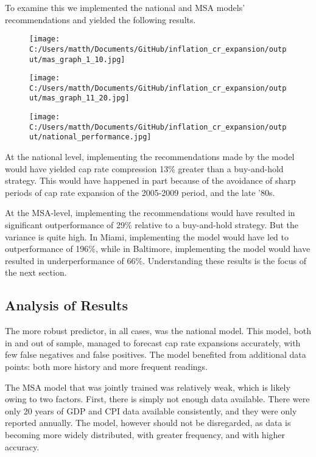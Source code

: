 To examine this we implemented the national and MSA models' recommendations and yielded the following results.

\begin{figure}
\hspace*{-0.25in}
\texttt{[image: C:/Users/matth/Documents/GitHub/inflation\_cr\_expansion/output/mas\_graph\_1\_10.jpg]}
\end{figure}

\begin{figure}
\hspace*{-0.25in}
\texttt{[image: C:/Users/matth/Documents/GitHub/inflation\_cr\_expansion/output/mas\_graph\_11\_20.jpg]}
\end{figure}

\begin{figure}
\texttt{[image: C:/Users/matth/Documents/GitHub/inflation\_cr\_expansion/output/national\_performance.jpg]}
\end{figure}

At the national level, implementing the recommendations made by the model would have yielded cap rate compression 13\% greater than a buy-and-hold strategy. This would have happened in part because of the avoidance of sharp periods of cap rate expansion of the 2005-2009 period, and the late '80s.

At the MSA-level, implementing the recommendations would have resulted in significant outperformance of 29\% relative to a buy-and-hold strategy. But the variance is quite high. In Miami, implementing the model would have led to outperformance of 196\%, while in Baltimore, implementing the model would have resulted in underperformance of 66\%. Understanding these results is the  focus of the next section.

\pagebreak

\subsection{Analysis of Results}

The more robust predictor, in all cases, was the national model. This model, both in and out of sample, managed to forecast cap rate expansions accurately, with few false negatives and false positives. The model benefited from additional data points: both more history and more frequent readings. 

The MSA model that was jointly trained was relatively weak, which is likely owing to two factors. First, there is simply not enough data available. There were only 20 years of GDP and CPI data available consistently, and they were only reported annually. The model, however should not be disregarded, as data is becoming more widely distributed, with greater frequency, and with higher accuracy.

